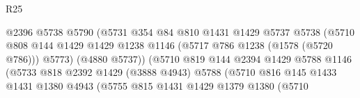 \begin{lexlean}{R25}
\begin{coremodule}
                                            @2396
                                            @5738
                                            @5790
                                            (@5731
                                              @354
                                              @84
                                              @810
                                              @1431
                                              @1429
                                              @5737
                                              @5738
                                              (@5710
                                                @808
                                                @144
                                                @1429
                                                @1429
                                                @1238
                                                @1146
                                                (@5717 @786 @1238 (@1578 (@5720 @786)))
                                                @5773)
                                              (@4880 @5737))
                                            (@5710
                                              @819
                                              @144
                                              @2394
                                              @1429
                                              @5788
                                              @1146
                                              (@5733
                                                @818
                                                @2392
                                                @1429
                                                (@3888 @4943)
                                                @5788
                                                (@5710
                                                  @816
                                                  @145
                                                  @1433
                                                  @1431
                                                  @1380
                                                  @4943
                                                  (@5755
                                                    @815
                                                    @1431
                                                    @1429
                                                    @1379
                                                    @1380
                                                    (@5710

\end{coremodule}
\end{lexlean}
